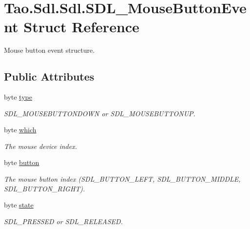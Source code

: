 \hypertarget{struct_tao_1_1_sdl_1_1_sdl_1_1_s_d_l___mouse_button_event}{
\section{Tao.Sdl.Sdl.SDL\_\-MouseButtonEvent Struct Reference}
\label{struct_tao_1_1_sdl_1_1_sdl_1_1_s_d_l___mouse_button_event}
}


Mouse button event structure.  


\subsection*{Public Attributes}
\begin{DoxyCompactItemize}
\item 
byte \hyperlink{struct_tao_1_1_sdl_1_1_sdl_1_1_s_d_l___mouse_button_event_af73bc2825de969d231eec503be2d37e0}{type}
\begin{DoxyCompactList}\small\item\em SDL\_\-MOUSEBUTTONDOWN or SDL\_\-MOUSEBUTTONUP. \item\end{DoxyCompactList}\item 
byte \hyperlink{struct_tao_1_1_sdl_1_1_sdl_1_1_s_d_l___mouse_button_event_a09f1d658c8d4c53a52238cbd995227ad}{which}
\begin{DoxyCompactList}\small\item\em The mouse device index. \item\end{DoxyCompactList}\item 
byte \hyperlink{struct_tao_1_1_sdl_1_1_sdl_1_1_s_d_l___mouse_button_event_ac38acdda954b63dea23005661b539f9f}{button}
\begin{DoxyCompactList}\small\item\em The mouse button index (SDL\_\-BUTTON\_\-LEFT, SDL\_\-BUTTON\_\-MIDDLE, SDL\_\-BUTTON\_\-RIGHT). \item\end{DoxyCompactList}\item 
byte \hyperlink{struct_tao_1_1_sdl_1_1_sdl_1_1_s_d_l___mouse_button_event_ac9f8588a4e768fc2f973ce149456311a}{state}
\begin{DoxyCompactList}\small\item\em SDL\_\-PRESSED or SDL\_\-RELEASED. \item\end{DoxyCompactList}\item 

\end{DoxyCompactItemize}
